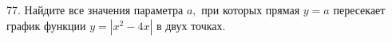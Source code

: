 77. Найдите все значения параметра $a,$ при которых прямая $y=a$ пересекает график функции $y=|x^2-4x|$ в двух точках.\\
